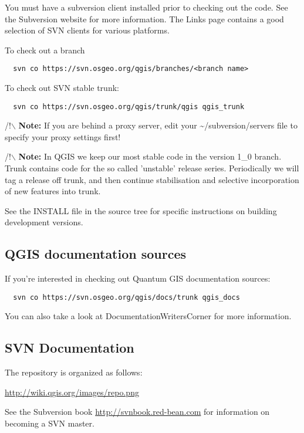 You must have a subversion client installed prior to checking out the code. See
the Subversion website for more information. The Links page contains a good
selection of SVN clients for various platforms.

To check out a branch

\begin{verbatim}
  svn co https://svn.osgeo.org/qgis/branches/<branch name>
\end{verbatim}

To check out SVN stable trunk:

\begin{verbatim}
  svn co https://svn.osgeo.org/qgis/trunk/qgis qgis_trunk
\end{verbatim}

/!$\backslash$ \textbf{Note:} If you are behind a proxy server, edit your \~{}/subversion/servers
file to specify your proxy settings first!

/!$\backslash$ \textbf{Note:} In QGIS we keep our most stable code in the version 1\_0 branch.
Trunk contains code for the so called 'unstable' release series. Periodically
we will tag a release off trunk, and then continue stabilisation and selective
incorporation of new features into trunk.

See the INSTALL file in the source tree for specific instructions on building
development versions. 

\subsection{QGIS documentation sources}
If you're interested in checking out Quantum GIS documentation sources:

\begin{verbatim}
  svn co https://svn.osgeo.org/qgis/docs/trunk qgis_docs
\end{verbatim}

You can also take a look at DocumentationWritersCorner for more information.

\subsection{SVN Documentation}
The repository is organized as follows:

\url{http://wiki.qgis.org/images/repo.png}

See the Subversion book \url{http://svnbook.red-bean.com} for information on becoming
a SVN master.

